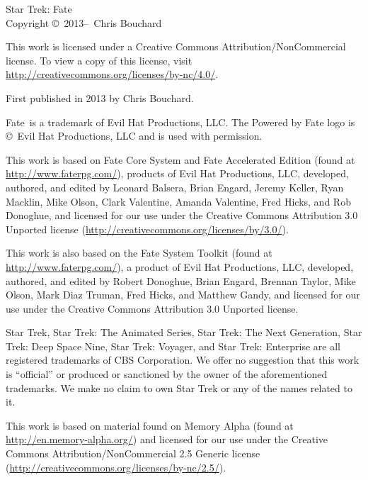 \begin{center}
    \small\setlength{\parskip}{\baselineskip}
    Star Trek: Fate\\
    Copyright \copyright\ 2013--\the\year\ Chris Bouchard

    {\Huge\ccbync}

    This work is licensed under a Creative Commons Attribution\-/NonCommercial
    license. To view a copy of this license, visit
    \url{http://creativecommons.org/licenses/by-nc/4.0/}.

    First published in 2013 by Chris Bouchard.

    Fate\texttrademark\ is a trademark of Evil Hat Productions, LLC. The
    Powered by Fate logo is \copyright\ Evil Hat Productions, LLC and is used
    with permission.

    This work is based on Fate Core System and Fate Accelerated Edition (found
    at \url{http://www.faterpg.com/}), products of Evil Hat Productions, LLC,
    developed, authored, and edited by Leonard Balsera, Brian Engard, Jeremy
    Keller, Ryan Macklin, Mike Olson, Clark Valentine, Amanda Valentine, Fred
    Hicks, and Rob Donoghue, and licensed for our use under the Creative
    Commons Attribution 3.0 Unported license
    (\url{http://creativecommons.org/licenses/by/3.0/}).

    This work is also based on the Fate System Toolkit (found at
    \url{http://www.faterpg.com/}), a product of Evil Hat Productions, LLC,
    developed, authored, and edited by Robert Donoghue, Brian Engard, Brennan
    Taylor, Mike Olson, Mark Diaz Truman, Fred Hicks, and Matthew Gandy, and
    licensed for our use under the Creative Commons Attribution 3.0 Unported
    license.

    Star Trek, Star Trek: The Animated Series, Star Trek: The Next Generation,
    Star Trek: Deep Space Nine, Star Trek: Voyager, and Star Trek: Enterprise
    are all registered trademarks of CBS Corporation. We offer no suggestion
    that this work is ``official'' or produced or sanctioned by the owner of
    the aforementioned trademarks. We make no claim to own Star Trek or any of
    the names related to it.

    This work is based on material found on Memory Alpha (found at
    \url{http://en.memory-alpha.org/}) and licensed for our use under the
    Creative Commons Attribution\-/NonCommercial 2.5 Generic license
    (\url{http://creativecommons.org/licenses/by-nc/2.5/}).
\end{center}

